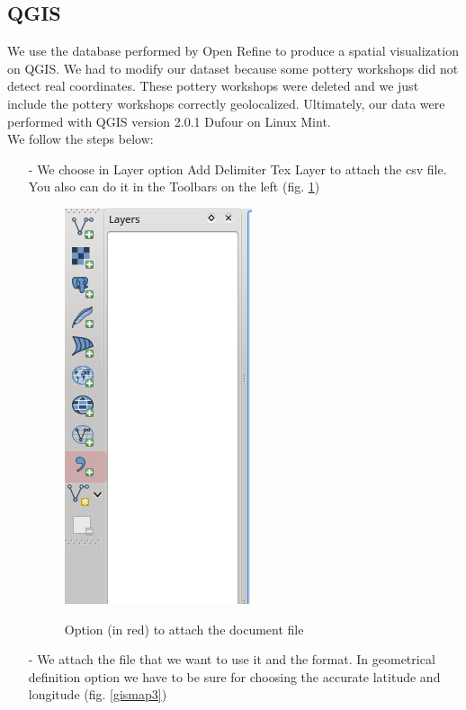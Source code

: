 \documentclass[10pt,a4paper]{article}
\begin{document}
\subsection{QGIS}

We use the database performed by Open Refine to produce a spatial visualization on QGIS. We had to modify our dataset because some pottery workshops did not detect real coordinates. These pottery workshops were deleted and we just include the pottery workshops correctly geolocalized. Ultimately, our data were performed with QGIS version 2.0.1 Dufour on Linux Mint. 
\\

We follow the steps below:
\begin{itemize}
\item[-] We choose in Layer option Add Delimiter Tex Layer to attach the csv file. You also can do it in the Toolbars on the left (fig. \ref{gismap2})
\begin{figure}[hdp]
\centering
\includegraphics[scale=0.50]{gismap2.png}
\label{gismap2}
\caption{Option (in red) to attach the document file}
\end{figure}
\item[-] We attach the file that we want to use it and the format. In geometrical definition option we have to be sure for choosing the accurate latitude and longitude (fig. \ref{gismap3})


\end{itemize}
\end{document}
